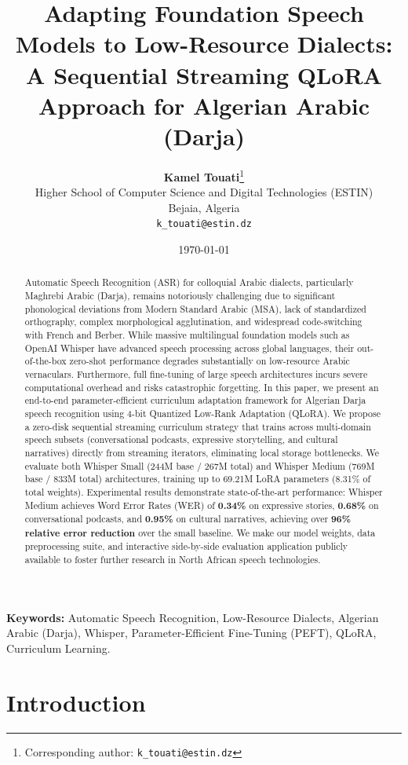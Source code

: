 \documentclass[11pt,a4paper]{article}
\title{\textbf{Adapting Foundation Speech Models to Low-Resource Dialects: A Sequential Streaming QLoRA Approach for Algerian Arabic (Darja)}}
\author{
    \textbf{Kamel Touati}\thanks{Corresponding author: \texttt{k\_touati@estin.dz}} \\
    Higher School of Computer Science and Digital Technologies (ESTIN) \\
    Bejaia, Algeria \\
    \texttt{k\_touati@estin.dz}
}
\date{\today}
\begin{document}
\maketitle

\begin{abstract}
Automatic Speech Recognition (ASR) for colloquial Arabic dialects, particularly Maghrebi Arabic (Darja), remains notoriously challenging due to significant phonological deviations from Modern Standard Arabic (MSA), lack of standardized orthography, complex morphological agglutination, and widespread code-switching with French and Berber. While massive multilingual foundation models such as OpenAI Whisper have advanced speech processing across global languages, their out-of-the-box zero-shot performance degrades substantially on low-resource Arabic vernaculars. Furthermore, full fine-tuning of large speech architectures incurs severe computational overhead and risks catastrophic forgetting. In this paper, we present an end-to-end parameter-efficient curriculum adaptation framework for Algerian Darja speech recognition using 4-bit Quantized Low-Rank Adaptation (QLoRA). We propose a zero-disk sequential streaming curriculum strategy that trains across multi-domain speech subsets (conversational podcasts, expressive storytelling, and cultural narratives) directly from streaming iterators, eliminating local storage bottlenecks. We evaluate both Whisper Small (244M base / 267M total) and Whisper Medium (769M base / 833M total) architectures, training up to 69.21M LoRA parameters (8.31\% of total weights). Experimental results demonstrate state-of-the-art performance: Whisper Medium achieves Word Error Rates (WER) of \textbf{0.34\%} on expressive stories, \textbf{0.68\%} on conversational podcasts, and \textbf{0.95\%} on cultural narratives, achieving over \textbf{96\% relative error reduction} over the small baseline. We make our model weights, data preprocessing suite, and interactive side-by-side evaluation application publicly available to foster further research in North African speech technologies.
\end{abstract}

\vspace{0.5cm}
\noindent\textbf{Keywords:} Automatic Speech Recognition, Low-Resource Dialects, Algerian Arabic (Darja), Whisper, Parameter-Efficient Fine-Tuning (PEFT), QLoRA, Curriculum Learning.

\section{Introduction}
\label{sec:introduction}
\end{document}
